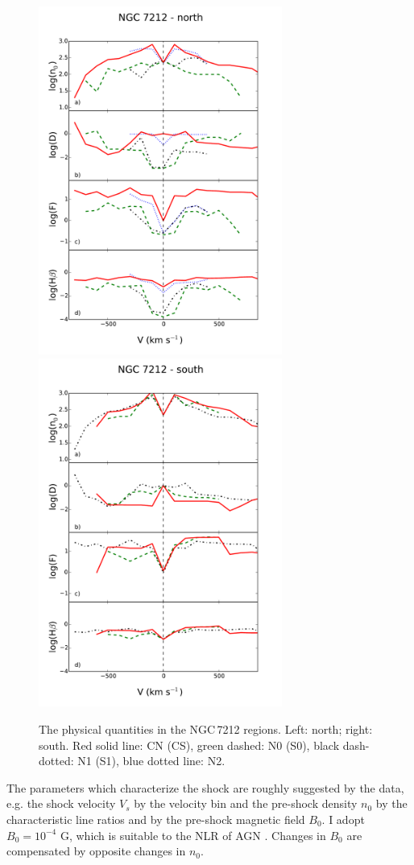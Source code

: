 \documentclass[../main.tex]{subfiles}
\begin{document}
\begin{figure}
\includegraphics[width=8.0cm]{images/paper1/n72n.pdf}
\includegraphics[width=8.0cm]{images/paper1/n72s.pdf}
\caption{The physical quantities in the NGC\,7212 regions. Left: north; right: south. Red solid line: CN (CS), green dashed: N0 (S0), black dash-dotted: N1 (S1), blue dotted line: N2.}
\label{fig:NGC_m}
\end{figure}


The parameters which characterize the shock are roughly suggested by the data, e.g. the  shock velocity $V_s$ by the velocity bin and the pre-shock density $n_0$ by the characteristic line ratios and by the pre-shock magnetic field $B_0$.
I adopt $B_0  = 10^{-4}$ G, which is suitable to the NLR of AGN \citep{Beck12}.
Changes in $B_0$  are compensated by opposite changes in $n_0$.
\end{document}
